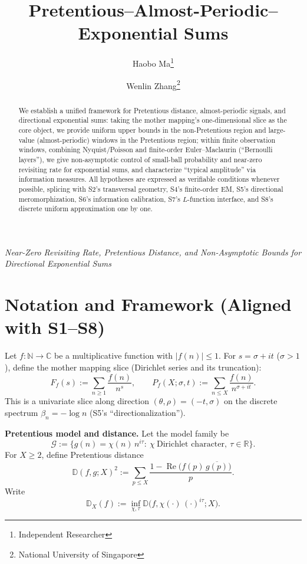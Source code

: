 \documentclass[11pt,a4paper]{article}
\title{Pretentious--Almost-Periodic--Exponential Sums}
\author{Haobo Ma\thanks{Independent Researcher} \and Wenlin Zhang\thanks{National University of Singapore}}
\date{}
\theoremstyle{remark}
\DeclareMathOperator{\Re}{Re}
\begin{document}
\maketitle

\begin{center}
\textit{Near-Zero Revisiting Rate, Pretentious Distance, and Non-Asymptotic Bounds for Directional Exponential Sums}
\end{center}

\begin{abstract}
We establish a unified framework for Pretentious distance, almost-periodic signals, and directional exponential sums: taking the mother mapping's one-dimensional slice as the core object, we provide uniform upper bounds in the non-Pretentious region and large-value (almost-periodic) windows in the Pretentious region; within finite observation windows, combining Nyquist/Poisson and finite-order Euler--Maclaurin (``Bernoulli layers''), we give non-asymptotic control of small-ball probability and near-zero revisiting rate for exponential sums, and characterize ``typical amplitude'' via information measures. All hypotheses are expressed as verifiable conditions whenever possible, splicing with S2's transversal geometry, S4's finite-order EM, S5's directional meromorphization, S6's information calibration, S7's $L$-function interface, and S8's discrete uniform approximation one by one.
\end{abstract}

\section{Notation and Framework (Aligned with S1--S8)}

Let $f:\mathbb{N}\to\mathbb{C}$ be a multiplicative function with $|f(n)|\le 1$. For $s=\sigma+it$ ($\sigma>1$), define the mother mapping slice (Dirichlet series and its truncation):
\begin{equation}
F_f(s):=\sum_{n\ge1}\frac{f(n)}{n^{s}},\qquad
P_f(X;\sigma,t):=\sum_{n\le X}\frac{f(n)}{n^{\sigma+it}}.
\end{equation}
This is a univariate slice along direction $(\theta,\rho)=(-t,\sigma)$ on the discrete spectrum $\beta_n=-\log n$ (S5's ``directionalization'').

\textbf{Pretentious model and distance.} Let the model family be
\begin{equation}
\mathcal{G}:=\bigl\{g(n)=\chi(n)\,n^{i\tau}:\ \chi\ \text{Dirichlet character},\ \tau\in\mathbb{R}\bigr\}.
\end{equation}
For $X\ge2$, define Pretentious distance
\begin{equation}
\mathbb{D}(f,g;X)^2:=\sum_{p\le X}\frac{1-\Re\!\bigl(f(p)\,\overline{g(p)}\bigr)}{p}.
\end{equation}
Write
\begin{equation}
\mathbb{D}_X(f):=\inf_{\chi,\tau}\mathbb{D}\bigl(f,\chi(\cdot)\,(\cdot)^{i\tau};X\bigr).
\end{equation}
\end{document}
